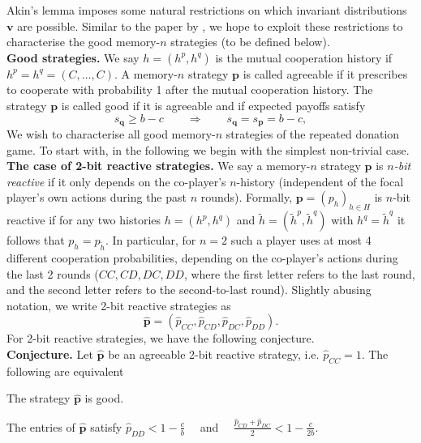 \documentclass{article}
\theoremstyle{definition}
\begin{document}
Akin's lemma imposes some natural restrictions on which invariant distributions $\mathbf{v}$ are possible. Similar to the paper by \citep{akin:EGADS:2016}, we hope to exploit these restrictions to characterise the good memory-$n$ strategies (to be defined below).\\

\noindent
{\bf Good strategies.} 
We say $h\!=\!(h^p,h^q)$ is the mutual cooperation history if $h^p\!=\!h^q\!=\!(C,\ldots,C)$. 
A memory-$n$ strategy $\mathbf{p}$ is called agreeable if it prescribes to cooperate with probability 1 after the mutual cooperation history. 
The strategy $\mathbf{p}$ is called good if it is agreeable and if expected payoffs satisfy
\begin{equation} \label{Eq:good}
    s_{\mathbf{q}} \geq b\!-\!c \qquad \Rightarrow \qquad s_{\mathbf{q}} = s_{\mathbf{p}} =  b\!-\!c,
\end{equation}
We wish to characterise all good memory-$n$ strategies of the repeated donation game. To start with, in the following we begin with the simplest non-trivial case.\\

\noindent
{\bf The case of 2-bit reactive strategies.} 
We say a memory-$n$ strategy $\mathbf{p}$ is {\it $n$-bit reactive} if it only depends on the co-player's $n$-history (independent of the focal player's own actions during the past $n$ rounds). Formally, $\mathbf{p}\!=\!(p_h)_{h \in H}$ is $n$-bit reactive if for any two histories $h=(h^p,h^q)$ and $\tilde{h}=(\tilde{h}^p,\tilde{h}^q)$ with $h^q=\tilde{h}^q$ it follows that $p_h = p_{\tilde{h}}$. In particular, for $n\!=\!2$ such a player uses at most 4 different cooperation probabilities, depending on the co-player's actions during the last 2 rounds ($CC, CD, DC, DD$, where the first letter refers to the last round, and the second letter refers to the second-to-last round). Slightly abusing notation, we write 2-bit reactive strategies as 
\begin{equation}
\mathbf{\hat{p}} = (\hat{p}_{CC}, \hat{p}_{CD}, \hat{p}_{DC}, \hat{p}_{DD}). 
\end{equation}
For 2-bit reactive strategies, we have the following conjecture.\\

\noindent
{\bf Conjecture.}
Let $\mathbf{\hat{p}}$ be an agreeable 2-bit reactive strategy, i.e. $\hat{p}_{CC}\!=\!1$. The following are equivalent\\[-0.7cm]
\begin{description} \setlength\itemsep{0pt}
\item[({\it i})] The strategy $\mathbf{\hat{p}}$ is good.
\item[({\it ii})] The entries of $\mathbf{\hat{p}}$ satisfy $\displaystyle \hat{p}_{DD} < 1\!-\! \frac{c}{b}$  ~~and~~ $\displaystyle \frac{\hat{p}_{CD} + \hat{p}_{DC}}{2} < 1-\frac{c}{2b}$.
\end{description}
\end{document}
